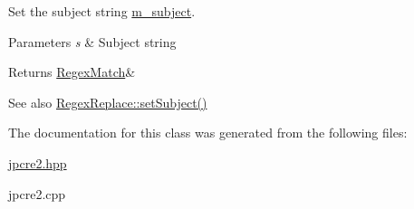 Set the subject string \hyperlink{classjpcre2_1_1RegexMatch_a9df4f1897e7fa33e05a9f6f938992ca7}{m\+\_\+subject}. 


\begin{DoxyParams}{Parameters}
{\em s} & Subject string \\
\hline
\end{DoxyParams}
\begin{DoxyReturn}{Returns}
\hyperlink{classjpcre2_1_1RegexMatch}{Regex\+Match}\& 
\end{DoxyReturn}
\begin{DoxySeeAlso}{See also}
\hyperlink{classjpcre2_1_1RegexReplace_a46eefdb105827920bebc8436721fa4cb_a46eefdb105827920bebc8436721fa4cb}{Regex\+Replace\+::set\+Subject()} 
\end{DoxySeeAlso}


The documentation for this class was generated from the following files\+:\begin{DoxyCompactItemize}
\item 
\hyperlink{jpcre2_8hpp}{jpcre2.\+hpp}\item 
jpcre2.\+cpp\end{DoxyCompactItemize}
